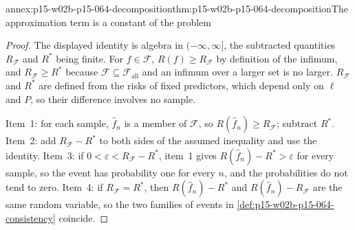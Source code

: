 \begin{annexitem}{annex:p15-w02b-p15-064-decomposition}{thm:p15-w02b-p15-064-decomposition}{The approximation term is a constant of the problem}
\begin{proof}
The displayed identity is algebra in \((-\infty,\infty]\), the subtracted
quantities \(R_{\mathcal F}\) and \(R^{*}\) being finite. For \(f\in\mathcal F\),
\(R(f)\geq R_{\mathcal F}\) by definition of the infimum, and
\(R_{\mathcal F}\geq R^{*}\) because \(\mathcal F\subseteq\mathcal F_{\mathrm{all}}\)
and an infimum over a larger set is no larger. \(R_{\mathcal F}\) and
\(R^{*}\) are defined from the risks of fixed predictors, which depend only on
\(\ell\) and \(P\), so their difference involves no sample.

Item~1: for each sample, \(\widehat f_n\) is a member of \(\mathcal F\), so
\(R(\widehat f_n)\geq R_{\mathcal F}\); subtract \(R^{*}\). Item~2: add
\(R_{\mathcal F}-R^{*}\) to both sides of the assumed inequality and use the
identity. Item~3: if \(0<\varepsilon<R_{\mathcal F}-R^{*}\), item~1 gives
\(R(\widehat f_n)-R^{*}>\varepsilon\) for every sample, so the event has
probability one for every \(n\), and the probabilities do not tend to zero.
Item~4: if \(R_{\mathcal F}=R^{*}\), then \(R(\widehat f_n)-R^{*}\) and
\(R(\widehat f_n)-R_{\mathcal F}\) are the same random variable, so the two
families of events in \cref{def:p15-w02b-p15-064-consistency} coincide.
\end{proof}
\end{annexitem}

